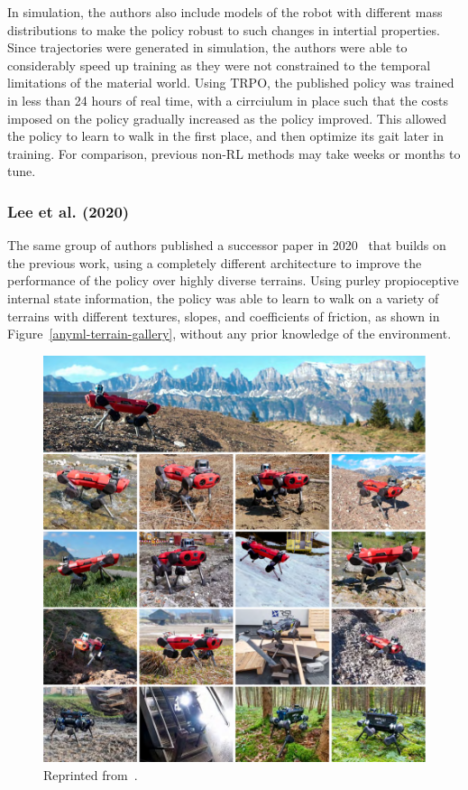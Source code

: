 \documentclass[12pt]{report}
\theoremstyle{definition}
\theoremstyle{remark}
\begin{document}
In simulation, the authors also include models of the robot with different mass distributions to make the policy robust to such changes in intertial properties. Since trajectories were generated in simulation, the authors were able to considerably speed up training as they were not constrained to the temporal limitations of the material world. Using TRPO, the published policy was trained in less than 24 hours of real time, with a cirrciulum in place such that the costs imposed on the policy gradually increased as the policy improved. This allowed the policy to learn to walk in the first place, and then optimize its gait later in training. For comparison, previous non-RL methods may take weeks or months to tune.

\subsubsection{Lee et al. (2020)}
The same group of authors published a successor paper in 2020~\cite{lee_learning_2020} that builds on the previous work, using a completely different architecture to improve the performance of the policy over highly diverse terrains. Using purley propioceptive internal state information, the policy was able to learn to walk on a variety of terrains with different textures, slopes, and coefficients of friction, as shown in Figure~\ref{anyml-terrain-gallery}, without any prior knowledge of the environment.
\begin{figure}[h]
    \centering
    \includegraphics[width=\linewidth]{figs/figure1.pdf}
    \caption{Reprinted from~\cite{lee_learning_2020}.}
    \label{fig:anymal-terrain-gallery}
\end{figure}
\end{document}
